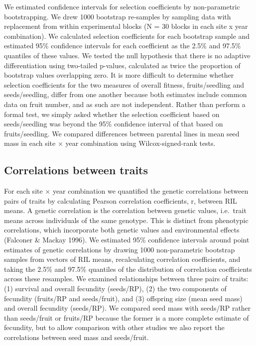 \documentclass[]{article}
\begin{document}
We estimated confidence intervals for selection coefficients by non-parametric bootstrapping. We drew 1000 bootstrap re-samples by sampling data with replacement from within experimental blocks (N = 30 blocks in each site x year combination). We calculated selection coefficients for each bootstrap sample and estimated 95\% confidence intervals for each coefficient as the 2.5\% and 97.5\% quantiles of these values. We tested the null hypothesis that there is no adaptive differentiation using two-tailed p-values, calculated as twice the proportion of bootstrap values overlapping zero. It is more difficult to determine whether selection coefficients for the two measures of overall fitness, fruits/seedling and seeds/seedling, differ from one another because both estimates include common data on fruit number, and as such are not independent. Rather than perform a formal test, we simply asked whether the selection coefficient based on seeds/seedling was beyond the 95\% confidence interval of that based on fruits/seedling. We compared differences between parental lines in mean seed mass in each site × year combination using Wilcox-signed-rank tests.

\hypertarget{correlations-between-traits}{%
\subsection{Correlations between traits}\label{correlations-between-traits}}

For each site × year combination we quantified the genetic correlations between pairs of traits by calculating Pearson correlation coefficients, r, between RIL means. A genetic correlation is the correlation between genetic values, i.e.~trait means across individuals of the same genotype. This is distinct from phenotypic correlations, which incorporate both genetic values and environmental effects (Falconer \& Mackay 1996). We estimated 95\% confidence intervals around point estimates of genetic correlations by drawing 1000 non-parametric bootstrap samples from vectors of RIL means, recalculating correlation coefficients, and taking the 2.5\% and 97.5\% quantiles of the distribution of correlation coefficients across these resamples. We examined relationships between three pairs of traits: (1) survival and overall fecundity (seeds/RP), (2) the two components of fecundity (fruits/RP and seeds/fruit), and (3) offspring size (mean seed mass) and overall fecundity (seeds/RP). We compared seed mass with seeds/RP rather than seeds/fruit or fruits/RP because the former is a more complete estimate of fecundity, but to allow comparison with other studies we also report the correlations between seed mass and seeds/fruit.
\end{document}
